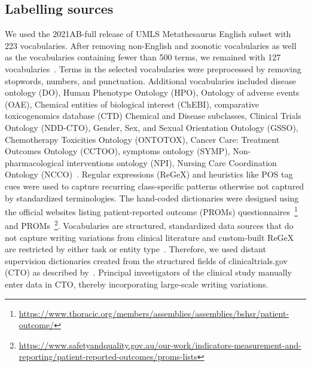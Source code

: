\documentclass[10.7pt,]{article}
\begin{document}
\subsection{Labelling sources}\label{lss}
%
We used the 2021AB-full release of UMLS Metathesaurus English subset with 223 vocabularies.
After removing non-English and zoonotic vocabularies as well as the vocabularies containing fewer than 500 terms, we remained with 127 vocabularies~\cite{humphreys1998unified}.
Terms in the selected vocabularies were preprocessed by removing stopwords, numbers, and punctuation.
Additional vocabularies included disease ontology (DO), Human Phenotype Ontology (HPO), Ontology of adverse events (OAE), Chemical entities of biological interest (ChEBI),  comparative toxicogenomics database (CTD) Chemical and Disease subclasses, Clinical Trials Ontology (NDD-CTO), Gender, Sex, and Sexual Orientation Ontology (GSSO), Chemotherapy Toxicities Ontology (ONTOTOX), Cancer Care: Treatment Outcomes Ontology (CCTOO), symptoms ontology (SYMP), Non-pharmacological interventions ontology (NPI), Nursing Care Coordination Ontology (NCCO)~\cite{schriml2012disease,robinson2008human,he2014oae,de2010chemical,lin2020cto,kronk2020development,geifman2011towards,rogier2021using,lin2018cancer,mohammed2012building,ninot2018definition}.
Regular expressions (ReGeX) and heuristics like POS tag cues were used to capture recurring class-specific patterns otherwise not captured by standardized terminologies.
The hand-coded dictionaries were designed using the official websites listing patient-reported outcome (PROMs) questionnaires~\footnote{\url{https://www.thoracic.org/members/assemblies/assemblies/bshsr/patient-outcome/}} and PROMs~\footnote{\url{https://www.safetyandquality.gov.au/our-work/indicators-measurement-and-reporting/patient-reported-outcomes/proms-lists}}.
Vocabularies are structured, standardized data sources that do not capture writing variations from clinical literature and custom-built ReGeX are restricted by either task or entity type~\cite{ratner2017snorkel,safranchik2020weakly}.
Therefore, we used distant supervision dictionaries created from the structured fields of clinicaltrials.gov (CTO) as described by~\cite{dhrangadhariya2022distant}.
Principal investigators of the clinical study manually enter data in CTO, thereby incorporating large-scale writing variations.  
%
%
%
\end{document}
